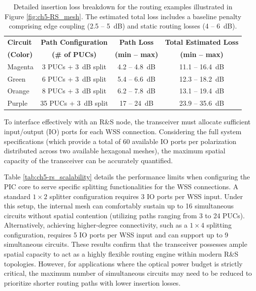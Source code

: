\begin{table}[htpb]
    \centering
    \caption{Detailed insertion loss breakdown for the routing examples illustrated in Figure 
    \ref{fig:ch5-RS_mesh}. The estimated total loss includes a baseline penalty comprising 
    edge coupling (2.5 -- 5~dB) and static routing losses (4 -- 6~dB).}
    \label{tab:ch5-rs_path_losses}
    \renewcommand{\arraystretch}{1.3}
    \begin{tabular}{lccc}
        \hline
        \textbf{Circuit} & \textbf{Path Configuration} & \textbf{Path Loss} & 
        \textbf{Total Estimated Loss} \\
        \textbf{(Color)} & \textbf{(\# of PUCs)} & \textbf{(min -- max)} & 
        \textbf{(min -- max)} \\
        \hline
        Magenta & 3 PUCs + 3~dB split  & 4.2 -- 4.8~dB & 11.1 -- 16.4~dB \\
        Green   & 6 PUCs + 3~dB split  & 5.4 -- 6.6~dB & 12.3 -- 18.2~dB \\
        Orange  & 8 PUCs + 3~dB split  & 6.2 -- 7.8~dB & 13.1 -- 19.4~dB \\
        Purple  & 35 PUCs + 3~dB split & 17 -- 24~dB & 23.9 -- 35.6~dB \\
        \hline
    \end{tabular}
\end{table}

\FloatBarrier

To interface effectively with an R\&S node, the transceiver must allocate sufficient input/output 
(IO) ports for each WSS connection. Considering the full system specifications (which provide a 
total of 60 available IO ports per polarization distributed across two available hexagonal meshes), 
the maximum spatial capacity of the transceiver can be accurately quantified.

Table \ref{tab:ch5-rs_scalability} details the performance limits when configuring the PIC core to 
serve specific splitting functionalities for the WSS connections. A standard $1\times 2$ splitter 
configuration requires 3 IO ports per WSS input. Under this setup, the internal mesh can 
comfortably sustain up to 16 simultaneous circuits without spatial contention (utilizing paths 
ranging from 3 to 24 PUCs). Alternatively, achieving higher-degree connectivity, such as a 
$1\times 4$ splitting configuration, requires 5 IO ports per WSS input and can support up to 9 
simultaneous circuits. These results confirm that the transceiver possesses ample spatial capacity 
to act as a highly flexible routing engine within modern R\&S topologies. However, for applications 
where the optical power budget is strictly critical, the maximum number of simultaneous circuits 
may need to be reduced to prioritize shorter routing paths with lower insertion losses.

